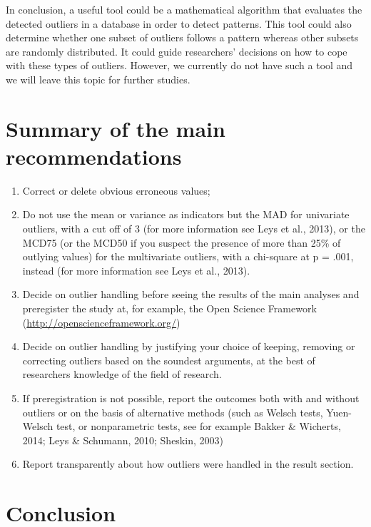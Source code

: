 \documentclass[man,floatsintext]{apa6}
\providecommand{\tightlist}{%
  \setlength{\itemsep}{0pt}\setlength{\parskip}{0pt}}
\begin{document}
In conclusion, a useful tool could be a mathematical algorithm that evaluates the detected outliers in a database in order to detect patterns. This tool could also determine whether one subset of outliers follows a pattern whereas other subsets are randomly distributed. It could guide researchers' decisions on how to cope with these types of outliers. However, we currently do not have such a tool and we will leave this topic for further studies.

\hypertarget{summary-of-the-main-recommendations}{%
\section{Summary of the main recommendations}\label{summary-of-the-main-recommendations}}

\begin{enumerate}
\def\labelenumi{\arabic{enumi})}
\tightlist
\item
  Correct or delete obvious erroneous values;
\item
  Do not use the mean or variance as indicators but the MAD for univariate outliers, with a cut off of 3 (for more information see Leys et al., 2013), or the MCD75 (or the MCD50 if you suspect the presence of more than 25\% of outlying values) for the multivariate outliers, with a chi-square at p = .001, instead (for more information see Leys et al., 2013).
\item
  Decide on outlier handling before seeing the results of the main analyses and preregister the study at, for example, the Open Science Framework (\url{http://openscienceframework.org/})
\item
  Decide on outlier handling by justifying your choice of keeping, removing or correcting outliers based on the soundest arguments, at the best of researchers knowledge of the field of research.
\item
  If preregistration is not possible, report the outcomes both with and without outliers or on the basis of alternative methods (such as Welsch tests, Yuen-Welsch test, or nonparametric tests, see for example Bakker \& Wicherts, 2014; Leys \& Schumann, 2010; Sheskin, 2003)
\item
  Report transparently about how outliers were handled in the result section.
\end{enumerate}

\hypertarget{conclusion}{%
\section{Conclusion}\label{conclusion}}
\end{document}
